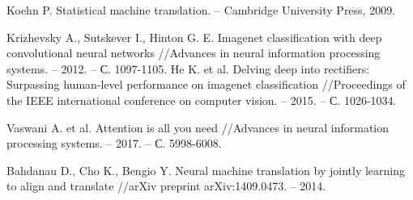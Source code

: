 \begingroup 
\renewcommand{\section}[2]{\anonsection{Список используемых источников}}
\begin{thebibliography}{00}

    Koehn P. Statistical machine translation. – Cambridge University Press, 2009.
    
    Krizhevsky A., Sutskever I., Hinton G. E. Imagenet classification with deep convolutional neural networks //Advances in neural information processing systems. – 2012. – С. 1097-1105.
    He K. et al. Delving deep into rectifiers: Surpassing human-level performance on imagenet classification //Proceedings of the IEEE international conference on computer vision. – 2015. – С. 1026-1034.
    
    Vaswani A. et al. Attention is all you need //Advances in neural information processing systems. – 2017. – С. 5998-6008.
    
    Bahdanau D., Cho K., Bengio Y. Neural machine translation by jointly learning to align and translate //arXiv preprint arXiv:1409.0473. – 2014.

\end{thebibliography}
\endgroup

\clearpage
